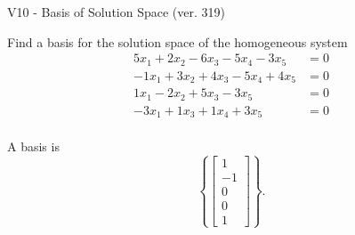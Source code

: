\begin{exercise}
  \begin{exerciseTitle}V10 - Basis of Solution Space (ver. 319)\end{exerciseTitle}
  \begin{exerciseStatement}
    Find a basis for the solution space of the homogeneous system 
\begin{align*}
 5 x_ 1 + 2 x_ 2 -6 x_ 3 -5 x_ 4 -3 x_ 5 &= 0  \\ 
  -1 x_ 1 + 3 x_ 2 + 4 x_ 3 -5 x_ 4 + 4 x_ 5 &= 0  \\ 
  1 x_ 1 -2 x_ 2 + 5 x_ 3 -3 x_ 5 &= 0  \\ 
  -3 x_ 1 + 1 x_ 3 + 1 x_ 4 + 3 x_ 5 &= 0  \\ 
 \end{align*}


 
  \end{exerciseStatement}

  \begin{exerciseAnswer}
   A basis is   
\[\left\{\left[\begin{array}{c}
1 \\
-1 \\
0 \\
0 \\
1
\end{array}\right]\right\}.\]

  


  \end{exerciseAnswer}
\end{exercise}